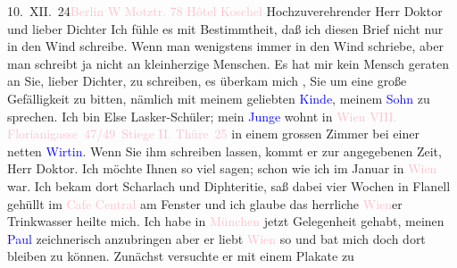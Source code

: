           \noindent{}10. XII. 24\hfill \textcolor{pink}{Berlin W Motztr. 78}{}\ledrightnote{\textcolor{pink}{Motzstraße}}{ }\pend
           \pstart
           \raggedleft{}\textcolor{pink}{Hôtel Koschel}{}\ledrightnote{\textcolor{pink}{Hotel Koschel}}\pend
           \pstart\center{}Hochzuverehrender Herr Doktor und lieber Dichter\pend\pstart
           Ich fühle es mit Bestimmtheit, daß ich diesen Brief nicht nur in \introOben{}den\introOben{} Wind schreibe. Wenn man wenigstens immer in den Wind schriebe, aber man
               schreibt ja nicht an kleinherzige Menschen. Es hat mir kein Mensch geraten an Sie,
               lieber Dichter, zu schreiben, es überkam mich \strikeout{\textcolor{gray}{×}}, Sie um eine große Gefälligkeit zu bitten, nämlich mit {\pb}meinem geliebten
                  \textcolor{blue}{Kinde}{}, meinem \textcolor{blue}{Sohn}{} zu sprechen. Ich bin
               Else Lasker-Schüler; mein \textcolor{blue}{Junge}{} wohnt in \textcolor{pink}{Wien \introOben{}VIII.\introOben{} Florianigasse 47/49 Stiege II. \introOben{}Thüre 25\introOben{}}{}\ledrightnote{\textcolor{pink}{Florianigasse}} in einem grossen Zimmer bei einer netten \textcolor{pink}{\textcolor{blue}{Wirtin}{}}{}. Wenn Sie ihm schreiben lassen, kommt er zur angegebenen Zeit, Herr Doktor. Ich
               möchte Ihnen so viel sagen; schon wie ich im Januar in
                  \textcolor{pink}{Wien}{}\ledrightnote{\textcolor{pink}{Wien}} war. Ich bekam dort Scharlach und
               Diphteritie, saß dabei vier Wochen in Flanell gehüllt im \textcolor{pink}{Cafe Central}{}\ledrightnote{\textcolor{pink}{Café Central}} am Fenster und ich glaube das herrliche \textcolor{pink}{Wien}{}\ledrightnote{\textcolor{pink}{Wien}}er Trinkwasser heilte mich. Ich habe in \textcolor{pink}{München}{}\ledrightnote{\textcolor{pink}{München}} jetzt Gelegenheit gehabt, meinen \textcolor{blue}{Paul}{}\ledrightnote{\textcolor{blue}{Paul Lasker-Schüler}} zeichnerisch anzubringen {\pb}aber er
               liebt \textcolor{pink}{Wien}{}\ledrightnote{\textcolor{pink}{Wien}} so und bat mich doch dort bleiben zu
               können. Zunächst versuchte er mit einem \label{K_L02653-2v}\label{K_L02653-2h} Plakate zu
